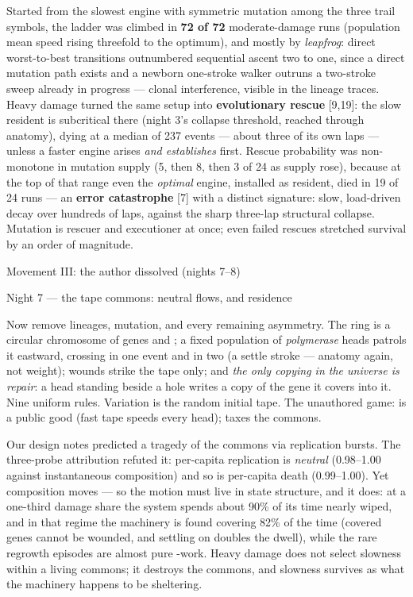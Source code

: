 Started from the slowest engine with symmetric mutation among the
three trail symbols, the ladder was climbed in {\bf 72 of 72}
moderate-damage runs (population mean speed rising threefold to the
optimum), and mostly by {\it leapfrog}: direct worst-to-best
transitions outnumbered sequential ascent two to one, since a
direct mutation path exists and a newborn one-stroke walker outruns
a two-stroke sweep already in progress --- clonal interference,
visible in the lineage traces. Heavy damage turned the same setup
into {\bf evolutionary rescue} [9,19]: the slow resident is
subcritical there (night 3's collapse threshold, reached through
anatomy), dying at a median of 237 events --- about three of its
own laps --- unless a faster engine arises {\it and establishes}
first. Rescue probability was non-monotone in mutation supply
(5, then 8, then 3 of 24 as supply rose), because at the top of
that range even the {\it optimal} engine, installed as resident,
died in 19 of 24 runs --- an {\bf error catastrophe} [7] with a
distinct signature: slow, load-driven decay over hundreds of laps,
against the sharp three-lap structural collapse. Mutation is
rescuer and executioner at once; even failed rescues stretched
survival by an order of magnitude.

\sec Movement III: the author dissolved (nights 7--8)

\secc Night 7 --- the tape commons: neutral flows, and residence

Now remove lineages, mutation, and every remaining asymmetry. The
ring is a circular chromosome of genes  and ; a fixed
population of {\it polymerase} heads patrols it eastward, crossing
 in one event and  in two (a settle stroke --- anatomy
again, not weight); wounds strike the tape only; and {\it the only
copying in the universe is repair}: a head standing beside a hole
writes a copy of the gene it covers into it. Nine uniform rules.
Variation is the random initial tape. The unauthored game: 
is a public good (fast tape speeds every head);  taxes the
commons.

Our design notes predicted a tragedy of the commons via
replication bursts. The three-probe attribution refuted it:
per-capita replication is {\it neutral} (0.98--1.00 against
instantaneous composition) and so is per-capita death
(0.99--1.00). Yet composition moves --- so the motion must live in
state structure, and it does: at a one-third damage share the
system spends about 90\% of its time nearly wiped, and in that
regime the machinery is found covering  82\% of the time
(covered genes cannot be wounded, and settling on  doubles
the dwell), while the rare regrowth episodes are almost pure
-work. Heavy damage does not select slowness within a living
commons; it destroys the commons, and slowness survives as what
the machinery happens to be sheltering.

